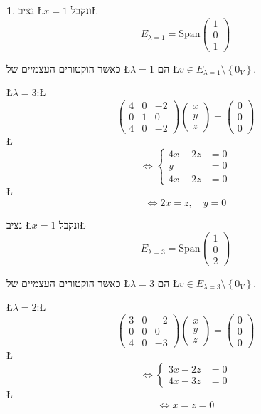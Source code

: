 \documentclass[english,hebrew]{article}
\theoremstyle{definition}
\theoremstyle{definition}
\newtheorem*{sol*}{\protect\solutionname}
\providecommand{\solutionname}{פתרון}
\begin{document}
\begin{sol*}
נציב \L{$x=1$} ונקבל\L{%
\[
E_{\lambda=1}=\text{Span}\begin{pmatrix}1\\
0\\
1
\end{pmatrix}
\]
}%

כאשר הוקטורים העצמיים של \L{$\lambda=1$} הם \L{$v\in E_{\lambda=1}\setminus\left\{ 0_{V}\right\} $}.

\L{$\lambda=3$}:\L{%
\[
\begin{pmatrix}4 & 0 & -2\\
0 & 1 & 0\\
4 & 0 & -2
\end{pmatrix}\begin{pmatrix}x\\
y\\
z
\end{pmatrix}=\begin{pmatrix}0\\
0\\
0
\end{pmatrix}
\]
}%
\L{%
\[
\iff\begin{cases}
4x-2z & =0\\
y & =0\\
4x-2z & =0
\end{cases}
\]
}%
\L{%
\[
\iff2x=z,\quad y=0
\]
}%

נציב \L{$x=1$} ונקבל\L{%
\[
E_{\lambda=3}=\text{Span}\begin{pmatrix}1\\
0\\
2
\end{pmatrix}
\]
}%

כאשר הוקטורים העצמיים של \L{$\lambda=3$} הם \L{$v\in E_{\lambda=3}\setminus\left\{ 0_{V}\right\} $}.

\L{$\lambda=2$}:\L{%
\[
\begin{pmatrix}3 & 0 & -2\\
0 & 0 & 0\\
4 & 0 & -3
\end{pmatrix}\begin{pmatrix}x\\
y\\
z
\end{pmatrix}=\begin{pmatrix}0\\
0\\
0
\end{pmatrix}
\]
}%
\L{%
\[
\iff\begin{cases}
3x-2z & =0\\
4x-3z & =0
\end{cases}
\]
}%
\L{%
\[
\iff x=z=0
\]
}%


\end{sol*}
\end{document}
